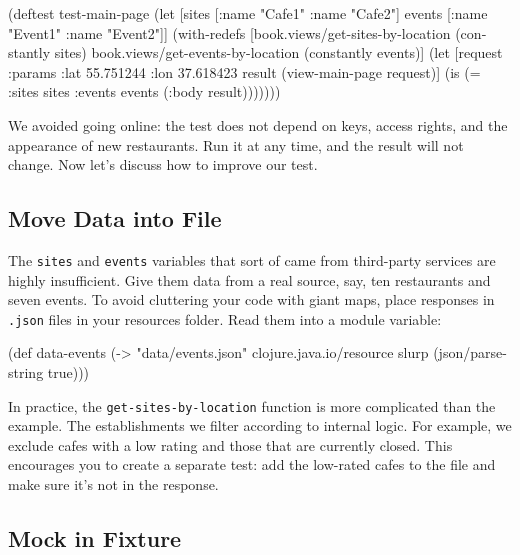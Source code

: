 \else

\begin{english}
  \begin{clojure}
(deftest test-main-page
  (let [sites [{:name "Cafe1"} {:name "Cafe2"}]
        events [{:name "Event1"} {:name "Event2"}]]
    (with-redefs
      [book.views/get-sites-by-location (constantly sites)
       book.views/get-events-by-location (constantly events)]
      (let [request {:params {:lat 55.751244
                              :lon 37.618423}}
            result (view-main-page request)]
        (is (= {:sites sites :events events}
               (:body result)))))))
  \end{clojure}
\end{english}

\fi

We avoided going online: the test does not depend on keys, access rights, and the appearance of new restaurants. Run it at any time, and the result will not change. Now let's discuss how to improve our test.

\subsection{Move Data into File}

The \verb|sites| and \verb|events| variables that sort of came from third-party services are highly insufficient. Give them data from a real source, say, ten restaurants and seven events. To avoid cluttering your code with giant maps, place responses in \verb|.json| files in your resources folder. Read them into a module variable:


\begin{english}
  \begin{clojure}
(def data-events
  (-> "data/events.json"
      clojure.java.io/resource
      slurp
      (json/parse-string true)))
  \end{clojure}
\end{english}

\mnoindent
In practice, the \verb|get-sites-by-location| function is more complicated than the example. The establishments we filter according to internal logic. For example, we exclude cafes with a low rating and those that are currently closed. This encourages you to create a separate test: add the low-rated cafes to the file and make sure it's not in the response.

\subsection{Mock in Fixture}

